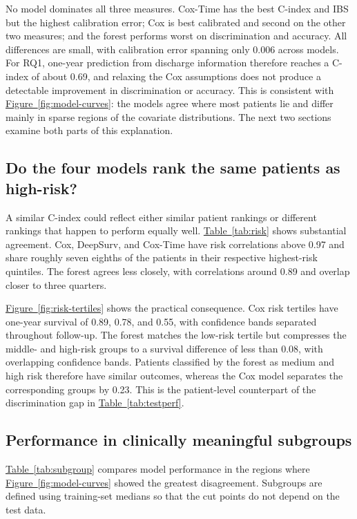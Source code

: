 \documentclass[11pt,a4paper]{article}
\newcommand{\tabref}[1]{\hyperref[#1]{Table~\ref*{#1}}}
\newcommand{\figref}[1]{\hyperref[#1]{Figure~\ref*{#1}}}
\begin{document}
No model dominates all three measures. Cox-Time has the best C-index and IBS but the highest calibration error; Cox is best calibrated and second on the other two measures; and the forest performs worst on discrimination and accuracy. All differences are small, with calibration error spanning only 0.006 across models. For RQ1, one-year prediction from discharge information therefore reaches a C-index of about 0.69, and relaxing the Cox assumptions does not produce a detectable improvement in discrimination or accuracy. This is consistent with \figref{fig:model-curves}: the models agree where most patients lie and differ mainly in sparse regions of the covariate distributions. The next two sections examine both parts of this explanation.

\subsection{Do the four models rank the same patients as high-risk?}

A similar C-index could reflect either similar patient rankings or different rankings that happen to perform equally well. \tabref{tab:risk} shows substantial agreement. Cox, DeepSurv, and Cox-Time have risk correlations above 0.97 and share roughly seven eighths of the patients in their respective highest-risk quintiles. The forest agrees less closely, with correlations around 0.89 and overlap closer to three quarters.

\figref{fig:risk-tertiles} shows the practical consequence. Cox risk tertiles have one-year survival of 0.89, 0.78, and 0.55, with confidence bands separated throughout follow-up. The forest matches the low-risk tertile but compresses the middle- and high-risk groups to a survival difference of less than 0.08, with overlapping confidence bands. Patients classified by the forest as medium and high risk therefore have similar outcomes, whereas the Cox model separates the corresponding groups by 0.23. This is the patient-level counterpart of the discrimination gap in \tabref{tab:testperf}.


\subsection{Performance in clinically meaningful subgroups}

\tabref{tab:subgroup} compares model performance in the regions where \figref{fig:model-curves} showed the greatest disagreement. Subgroups are defined using training-set medians so that the cut points do not depend on the test data.
\end{document}
